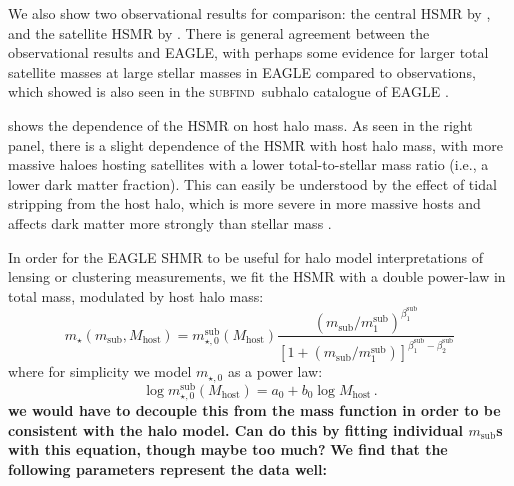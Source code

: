 \documentclass[usenatbib,fleqn]{mnras}
\newcommand{\comment}[1]{\textbf{\color{magenta} #1}}
\newcommand{\eagle}{EAGLE}
\newcommand{\msub}{m_\mathrm{sub}}
\newcommand{\Mhost}{M_\mathrm{host}}
\newcommand{\mstar}{m_\star}
\newcommand{\subfind}{\textsc{subfind}}
\begin{document}
We also show two observational results for comparison: the central HSMR by \cite{vanuitert16}, and the satellite HSMR by \cite{sifon18_meneacs}. There is general agreement between the observational results and \eagle, with perhaps some evidence for larger total satellite masses at large stellar masses in EAGLE compared to observations, which \cite{sifon18_meneacs} showed is also seen in the \subfind\ subhalo catalogue of EAGLE \citep{}.

 shows the dependence of the HSMR on host halo mass. As seen in the right panel, there is a slight dependence of the HSMR with host halo mass, with more massive haloes hosting satellites with a lower total-to-stellar mass ratio (i.e., a lower dark matter fraction). This can easily be understood by the effect of tidal stripping from the host halo, which is more severe in more massive hosts and affects dark matter more strongly than stellar mass \citep[e.g.,][]{}. 

In order for the EAGLE SHMR to be useful for halo model interpretations of lensing or clustering measurements, we fit the HSMR with a double power-law in total mass, modulated by host halo mass:
\begin{equation}\label{eq:shmr_Mh}
  \mstar(\msub,\Mhost)
    = m_{\star,0}^\mathrm{sub}(\Mhost)
      \frac{\left(\msub/m_1^\mathrm{sub}\right)^{\beta_1^\mathrm{sub}}}
           {\left[1+\left(\msub/m_1^\mathrm{sub}\right)\right]
                 ^{\beta_1^\mathrm{sub}-\beta_2^\mathrm{sub}}
           }
\end{equation}
where for simplicity we model $m_{\star,0}$ as a power law:
\begin{equation}\label{eq:mstar_0}
 \log m_{\star,0}^\mathrm{sub}(\Mhost) = a_\mathrm{0} + b_\mathrm{0}\log \Mhost \,.
\end{equation}
\comment{we would have to decouple this from the mass function in order to be consistent with the halo model. Can do this by fitting individual $\msub$s with this equation, though maybe too much?}
\comment{We find that the following parameters represent the data well:}
\end{document}
